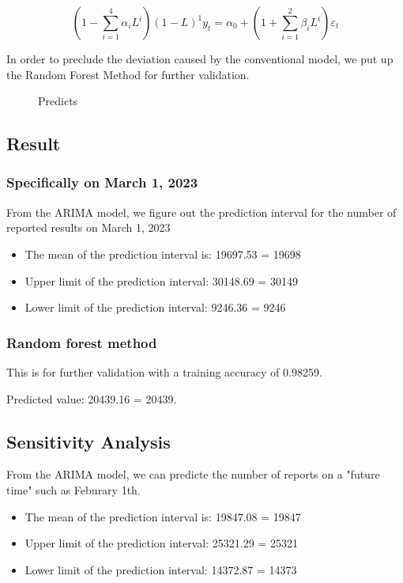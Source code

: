 \documentclass{mcmthesis}
\begin{document}
\[\left(1-\sum_{i=1}^4 \alpha_i L^i\right)(1-L)^1y_t=\alpha_0+\left(1+\sum_{i=1}^2 \beta_i L^i\right) \varepsilon_t \]

In order to preclude the deviation caused by the conventional model, we put up the Random Forest Method for further validation.

\begin{figure}[htbp]
\centering    %
\caption{Predicts} %
\label{fig:1}  %
\end{figure}


\subsection{Result} 
\subsubsection{Specifically on March 1, 2023}
\hspace*{0.6cm}From the ARIMA model, we figure out the prediction interval for the number of reported results on March 1, 2023
\begin{itemize}
\item The mean of the prediction interval is: 19697.53 = 19698
\item Upper limit of the prediction interval: 30148.69 = 30149
\item Lower limit of the prediction interval: 9246.36 = 9246
\end{itemize}


\subsubsection{Random forest method}
\hspace*{0.6cm}This is for further validation with a training accuracy of 0.98259.

Predicted value: 20439.16 = 20439.

\subsection{Sensitivity Analysis }
\hspace*{0.6cm}From the ARIMA model, we can predicte the number of reports on a "future time" such as Feburary 1th.
\begin{itemize}
\item The mean of the prediction interval is: 19847.08 = 19847
\item Upper limit of the prediction interval: 25321.29 = 25321
\item Lower limit of the prediction interval: 14372.87 = 14373
\end{itemize}
\end{document}
